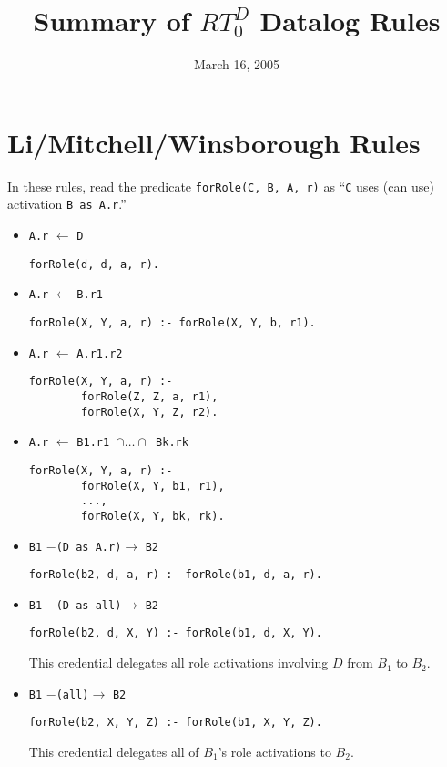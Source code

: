 \documentclass{article}
\newcommand{\predicate}[1]{\texttt{#1}}
\newcommand{\memcert}[2]{\texttt{#1} $\leftarrow$ \texttt{#2}}
\newcommand{\delcert}[3]{\texttt{#1} $-$\texttt{(#2)}$\rightarrow$ \texttt{#3}}
\newcommand{\activate}[2]{\texttt{#1 as #2}}
\begin{document}
\title{Summary of $RT_0^D$ Datalog Rules}
\date{March 16, 2005}
\maketitle

\section{Li/Mitchell/Winsborough Rules}

In these rules, read the predicate \predicate{forRole(C, B, A, r)} as
``\texttt{C} uses (can use) activation \activate{B}{A.r}.''

\begin{itemize}

\item \memcert{A.r}{D}

\texttt{forRole(d, d, a, r).}

\item \memcert{A.r}{B.r1}

\texttt{forRole(X, Y, a, r) :- forRole(X, Y, b, r1).}

\item \memcert{A.r}{A.r1.r2}
\begin{verbatim}
forRole(X, Y, a, r) :-
        forRole(Z, Z, a, r1),
        forRole(X, Y, Z, r2).
\end{verbatim}

\item \memcert{A.r}{B1.r1 $\cap \ldots \cap$ Bk.rk}
\begin{verbatim}
forRole(X, Y, a, r) :-
        forRole(X, Y, b1, r1),
        ...,
        forRole(X, Y, bk, rk).
\end{verbatim}

\item \delcert{B1}{D as A.r}{B2}

\texttt{forRole(b2, d, a, r) :- forRole(b1, d, a, r).}

\item \delcert{B1}{D as all}{B2}

\texttt{forRole(b2, d, X, Y) :- forRole(b1, d, X, Y).}

This credential delegates all role activations involving $D$ from $B_1$
to $B_2$.

\item \delcert{B1}{all}{B2}

\texttt{forRole(b2, X, Y, Z) :- forRole(b1, X, Y, Z).}

This credential delegates all of $B_1$'s role activations to $B_2$.

\end{itemize}
\end{document}
